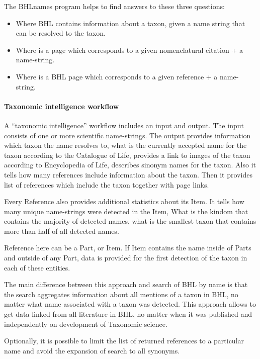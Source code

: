 \documentclass[
]{article}
\providecommand{\tightlist}{%
  \setlength{\itemsep}{0pt}\setlength{\parskip}{0pt}}
\begin{document}
The BHLnames program helps to find answers to these three questions:

\begin{itemize}
\tightlist
\item
  Where BHL contains information about a taxon, given a name string that
  can be resolved to the taxon.
\item
  Where is a page which corresponds to a given nomenclatural citation +
  a name-string.
\item
  Where is a BHL page which corresponds to a given reference + a
  name-string.
\end{itemize}

\hypertarget{taxonomic-intelligence-workflow}{%
\paragraph{Taxonomic intelligence
workflow}\label{taxonomic-intelligence-workflow}}

A ``taxonomic intelligence'' workflow includes an input and output. The
input consists of one or more scientific name-strings. The output
provides information which taxon the name resolves to, what is the
currently accepted name for the taxon according to the Catalogue of
Life, provides a link to images of the taxon according to Encyclopedia
of Life, describes sinonym names for the taxon. Also it tells how many
references include information about the taxon. Then it provides list of
references which include the taxon together with page links.

Every Reference also provides additional statistics about its Item. It
tells how many unique name-strings were detected in the Item, What is
the kindom that contains the majority of detected names, what is the
smallest taxon that contains more than half of all detected names.

Reference here can be a Part, or Item. If Item contains the name inside
of Parts and outside of any Part, data is provided for the first
detection of the taxon in each of these entities.

The main difference between this approach and search of BHL by name is
that the search aggregates information about all mentions of a taxon in
BHL, no matter what name associated with a taxon was detected. This
approach allows to get data linked from all literature in BHL, no matter
when it was published and independently on development of Taxonomic
science.

Optionally, it is possible to limit the list of returned references to a
particular name and avoid the expansion of search to all synonyms.
\end{document}
